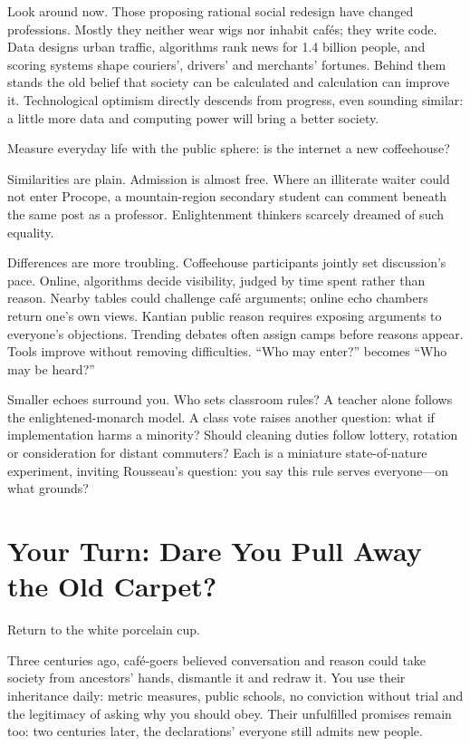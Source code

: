 Look around now. Those proposing rational social redesign have changed professions. Mostly they neither wear wigs nor inhabit cafés; they write code. Data designs urban traffic, algorithms rank news for 1.4 billion people, and scoring systems shape couriers', drivers' and merchants' fortunes. Behind them stands the old belief that society can be calculated and calculation can improve it. Technological optimism directly descends from progress, even sounding similar: a little more data and computing power will bring a better society.

Measure everyday life with the public sphere: is the internet a new coffeehouse?

Similarities are plain. Admission is almost free. Where an illiterate waiter could not enter Procope, a mountain-region secondary student can comment beneath the same post as a professor. Enlightenment thinkers scarcely dreamed of such equality.

Differences are more troubling. Coffeehouse participants jointly set discussion's pace. Online, algorithms decide visibility, judged by time spent rather than reason. Nearby tables could challenge café arguments; online echo chambers return one's own views. Kantian public reason requires exposing arguments to everyone's objections. Trending debates often assign camps before reasons appear. Tools improve without removing difficulties. ``Who may enter?'' becomes ``Who may be heard?''

Smaller echoes surround you. Who sets classroom rules? A teacher alone follows the enlightened-monarch model. A class vote raises another question: what if implementation harms a minority? Should cleaning duties follow lottery, rotation or consideration for distant commuters? Each is a miniature state-of-nature experiment, inviting Rousseau's question: you say this rule serves everyone---on what grounds?

\section[Your Turn: Pull Away the Carpet?]{Your Turn: Dare You Pull Away the Old Carpet?}
Return to the white porcelain cup.

Three centuries ago, café-goers believed conversation and reason could take society from ancestors' hands, dismantle it and redraw it. You use their inheritance daily: metric measures, public schools, no conviction without trial and the legitimacy of asking why you should obey. Their unfulfilled promises remain too: two centuries later, the declarations' everyone still admits new people.

